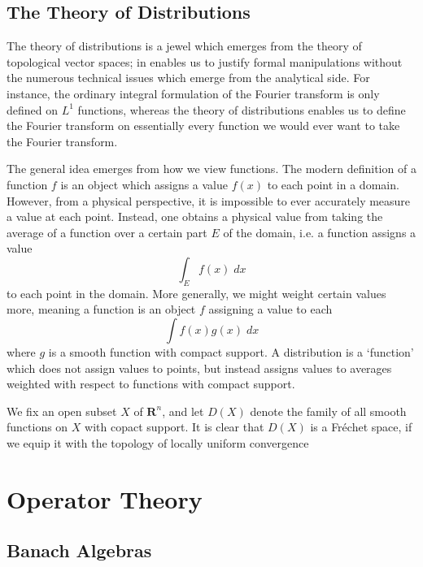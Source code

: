 \chapter{The Theory of Distributions}

The theory of distributions is a jewel which emerges from the theory of topological vector spaces; in enables us to justify formal manipulations without the numerous technical issues which emerge from the analytical side. For instance, the ordinary integral formulation of the Fourier transform is only defined on $L^1$ functions, whereas the theory of distributions enables us to define the Fourier transform on essentially every function we would ever want to take the Fourier transform.

The general idea emerges from how we view functions. The modern definition of a function $f$ is an object which assigns a value $f(x)$ to each point in a domain. However, from a physical perspective, it is impossible to ever accurately measure a value at each point. Instead, one obtains a physical value from taking the average of a function over a certain part $E$ of the domain, i.e. a function assigns a value
%
\[ \int_E f(x)\; dx \]
%
to each point in the domain. More generally, we might weight certain values more, meaning a function is an object $f$ assigning a value to each
%
\[ \int f(x) g(x)\; dx \]
%
where $g$ is a smooth function with compact support. A distribution is a `function' which does not assign values to points, but instead assigns values to averages weighted with respect to functions with compact support.

We fix an open subset $X$ of $\mathbf{R}^n$, and let $D(X)$ denote the family of all smooth functions on $X$ with copact support. It is clear that $D(X)$ is a Fr\'{e}chet space, if we equip it with the topology of locally uniform convergence 










\part{Operator Theory}





\chapter{Banach Algebras}

